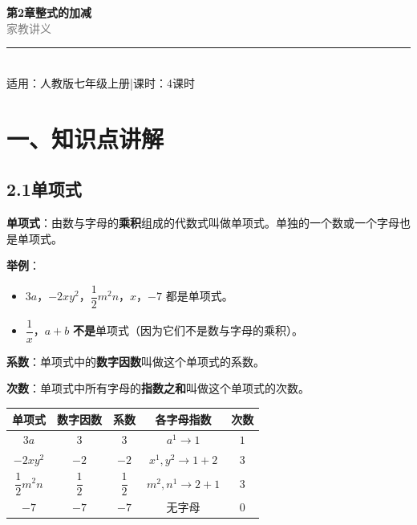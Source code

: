 \documentclass[12pt, a4paper]{ctexart}
\begin{document}
\begin{center}
{\Huge\bfseries\textcolor{mainblue}{第2章\quad 整式的加减}}\\[12pt]
{\Large\textcolor{gray}{家\quad 教\quad 讲\quad 义}}\\[8pt]
\rule{0.6\textwidth}{1pt}\\[8pt]
{\normalsize 适用：人教版\quad 七年级上册\quad |\quad 课时：4课时}
\end{center}
\vspace{10pt}

\section*{\textcolor{mainblue}{一、知识点讲解}}

\subsection*{2.1\quad 单项式}

\begin{knowledgebox}[单项式的定义]
\textbf{单项式}：由数与字母的\textbf{乘积}组成的代数式叫做单项式。单独的一个数或一个字母也是单项式。

\textbf{举例}：
\begin{itemize}[leftmargin=*]
  \item $3a$，$-2xy^2$，$\dfrac{1}{2}m^2n$，$x$，$-7$ 都是单项式。
  \item $\dfrac{1}{x}$，$a+b$ \textbf{不是}单项式（因为它们不是数与字母的乘积）。
\end{itemize}
\end{knowledgebox}

\begin{knowledgebox}[单项式的系数与次数]
\textbf{系数}：单项式中的\textbf{数字因数}叫做这个单项式的系数。

\textbf{次数}：单项式中所有字母的\textbf{指数之和}叫做这个单项式的次数。

\begin{center}
\renewcommand{\arraystretch}{1.4}
\begin{tabular}{ccccc}
\toprule
\textbf{单项式} & \textbf{数字因数} & \textbf{系数} & \textbf{各字母指数} & \textbf{次数}\\
\midrule
$3a$ & $3$ & $3$ & $a^1 \to 1$ & $1$\\
$-2xy^2$ & $-2$ & $-2$ & $x^1, y^2 \to 1+2$ & $3$\\
$\dfrac{1}{2}m^2n$ & $\dfrac{1}{2}$ & $\dfrac{1}{2}$ & $m^2, n^1 \to 2+1$ & $3$\\
$-7$ & $-7$ & $-7$ & 无字母 & $0$\\
\bottomrule
\end{tabular}
\end{center}
\end{knowledgebox}
\end{document}
